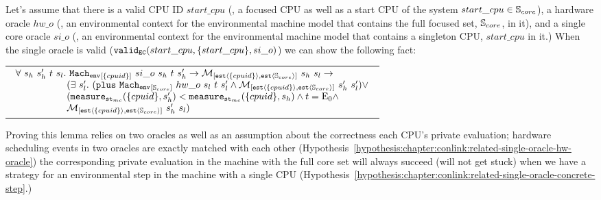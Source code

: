 \begin{lemma}
\label{lemma:chapter:conlink:one-env-refines-env}
Let's assume that there is a valid CPU ID $start\_cpu$ (\ie, a focused CPU as well as a start CPU of the system
$start\_cpu \in {\mathbb{S}_{core}}$),  a hardware oracle $hw\_o$ (\ie, an environmental context for the environmental machine model that contains the full focused set, ${\mathbb{S}_{core}}$, in it), 
and a single core oracle $si\_o$ (\ie, an environmental context for the environmental machine model that contains a singleton CPU, $start\_cpu$ in it.)
When the single oracle is valid ($ {{\mathrm{\texttt{valid}}}_{{\mathrm{\texttt{EC}}}}}({start\_cpu}, {\{start\_cpu\}}, {si\_o})$) we can show the following fact:
\begin{center}
\begin{tabular}{P{0.95\textwidth}}
$
\begin{array}{l}
\forall \ s_h \ s_h' \ t \ s_l. \ \envstep{\set{cpuid}}{si\_o}{s_h}{t}{s_h'} \rightarrow  \matchestateestate{\set{cpuid}}{s_h}{s_l} \rightarrow \\
\ \ \ \ \ \ \ \ \ \ \ \ \ \ \ \ (\exists \ s_l' .\ (\ccplusstep{\envstep{\coreset}{hw\_o}{s_l}{t}{s_l'}} \wedge \matchestateestate{\set{cpuid}}{s_h'}{s_l'}) \vee \\ 
\ \ \ \ \ \ \ \ \ \ \ \ \ \ \ \ (\mcstatemeasurenoeq{\set{cpuid}}{s_h'} < \mcstatemeasurenoeq{\set{cpuid}}{s_h} \wedge t = \ccemptytrace \wedge \\ 
\ \ \ \ \ \ \ \ \ \ \ \ \ \ \ \ \matchestateestate{\set{cpuid}}{s_h'}{s_l})\\
\end{array}
$
\end{tabular}
\end{center}
\end{lemma}

Proving this lemma relies on two oracles 
as well as an assumption about the correctness each CPU's private evaluation;
hardware scheduling events in two oracles are exactly matched with each other (Hypothesis~\ref{hypothesis:chapter:conlink:related-single-oracle-hw-oracle})
the corresponding private evaluation in the machine with the full core set
will always succeed (will not get stuck) when we have a strategy for an environmental step in the machine with a single CPU
(Hypothesis~\ref{hypothesis:chapter:conlink:related-single-oracle-concrete-step}.)

